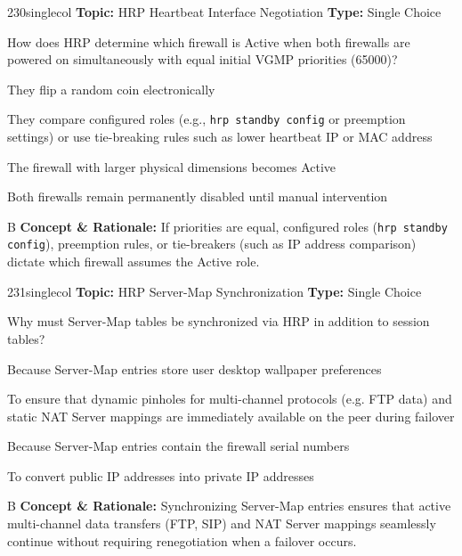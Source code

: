 \begin{qcard}{230}{singlecol}
\textcolor{darkslate!75}{\small\textbf{Topic:} HRP Heartbeat Interface Negotiation \hfill \textbf{Type:} Single Choice}\vspace{0.4em}\par
How does HRP determine which firewall is Active when both firewalls are powered on simultaneously with equal initial VGMP priorities (65000)?
\begin{qoptions}
\item They flip a random coin electronically
\item They compare configured roles (e.g., \texttt{hrp standby config} or preemption settings) or use tie-breaking rules such as lower heartbeat IP or MAC address
\item The firewall with larger physical dimensions becomes Active
\item Both firewalls remain permanently disabled until manual intervention
\end{qoptions}
\end{qcard}
\nopagebreak
\begin{explainbox}{B}
\textbf{Concept \& Rationale:} If priorities are equal, configured roles (\texttt{hrp standby config}), preemption rules, or tie-breakers (such as IP address comparison) dictate which firewall assumes the Active role.
\end{explainbox}

\begin{qcard}{231}{singlecol}
\textcolor{darkslate!75}{\small\textbf{Topic:} HRP Server-Map Synchronization \hfill \textbf{Type:} Single Choice}\vspace{0.4em}\par
Why must Server-Map tables be synchronized via HRP in addition to session tables?
\begin{qoptions}
\item Because Server-Map entries store user desktop wallpaper preferences
\item To ensure that dynamic pinholes for multi-channel protocols (e.g. FTP data) and static NAT Server mappings are immediately available on the peer during failover
\item Because Server-Map entries contain the firewall serial numbers
\item To convert public IP addresses into private IP addresses
\end{qoptions}
\end{qcard}
\nopagebreak
\begin{explainbox}{B}
\textbf{Concept \& Rationale:} Synchronizing Server-Map entries ensures that active multi-channel data transfers (FTP, SIP) and NAT Server mappings seamlessly continue without requiring renegotiation when a failover occurs.
\end{explainbox}

